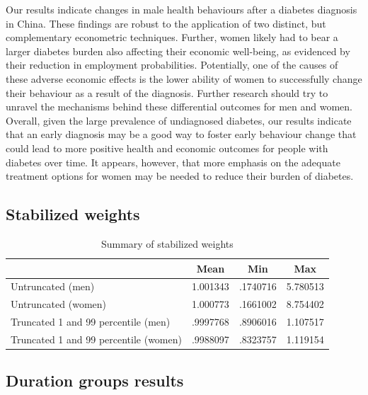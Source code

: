 Our results indicate changes in male health behaviours after a diabetes diagnosis in China. These findings are robust to the application of two distinct, but complementary econometric techniques. Further, women likely had to bear a larger diabetes burden also affecting their economic well-being, as evidenced by their reduction in employment probabilities. Potentially, one of the causes of these adverse economic effects is the lower ability of women to successfully change their behaviour as a result of the diagnosis. Further research should try to unravel the mechanisms behind these differential outcomes for men and women. Overall, given the large prevalence of undiagnosed diabetes, our results indicate that an early diagnosis may be a good way to foster early behaviour change that could lead to more positive health and economic outcomes for people with diabetes over time. It appears, however, that more emphasis on the adequate treatment options for women may be needed to reduce their burden of diabetes. 

\clearpage

\subsection*{Stabilized weights}

\begin{table}[p]
\caption{\label{tab:stabweights}Summary of stabilized weights}
\begin{adjustbox}{max width=\linewidth}  
{
\def\sym#1{\ifmmode^{#1}\else\(^{#1}\)\fi}
\begin{tabular}{l*{1}{ccc}}
\toprule
                    &        Mean&         Min&         Max\\
\midrule
Untruncated (men)   &    1.001343&    .1740716&   5.780513\\
Untruncated (women) &    1.000773&   .1661002&  8.754402\\
Truncated 1 and 99 percentile (men)&    .9997768&    .8906016&    1.107517\\
Truncated 1 and 99 percentile (women)&    .9988097&    .8323757&    1.119154\\
\end{tabular}
}
\end{adjustbox}
\end{table}

\FloatBarrier

\clearpage
\subsection{Duration groups results}


